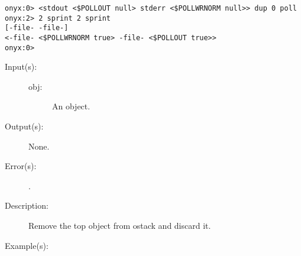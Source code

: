 \begin{description}
\begin{description}
\begin{verbatim}
onyx:0> <stdout <$POLLOUT null> stderr <$POLLWRNORM null>> dup 0 poll
onyx:2> 2 sprint 2 sprint
[-file- -file-]
<-file- <$POLLWRNORM true> -file- <$POLLOUT true>>
onyx:0>
		\end{verbatim}
	\end{description}
\label{systemdict:pop}
\item[{\onyxop{obj}{pop}{--}}: ]
	\begin{description}\item[]
	\item[Input(s): ]
		\begin{description}\item[]
		\item[obj: ]
			An object.
		\end{description}
	\item[Output(s): ] None.
	\item[Error(s): ]
		\begin{description}\item[]
		\item[.]
		\end{description}
	\item[Description: ]
		Remove the top object from ostack and discard it.
	\item[Example(s): ]\begin{verbatim}


\end{verbatim}
\end{description}
\end{description}
